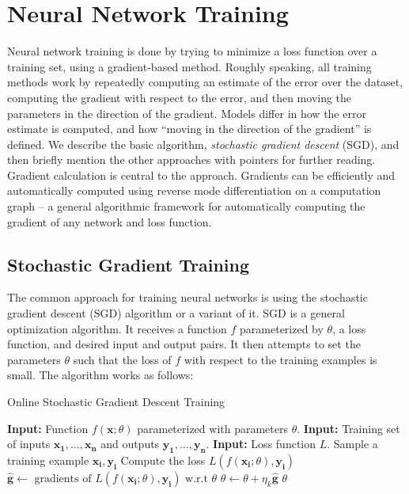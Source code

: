 \documentclass[jair,twoside,11pt,theapa]{article}
\newcommand{\m}[1]{\mathbf{#1}}%
\begin{document}
{\clearpage
\section{Neural Network Training}
\label{sec:training}

Neural network training is done by trying to minimize a loss function over a
training set, using a gradient-based method.  Roughly speaking, all training
methods work by repeatedly computing an estimate of the error over the dataset, computing
the gradient with respect to the error, and then moving the parameters in the direction
of the gradient.  Models differ in how the error estimate is computed, and how
``moving in the direction of the gradient'' is defined.  We describe the
basic algorithm, \emph{stochastic gradient descent} (SGD),
and then briefly mention the other approaches with pointers for further reading.
Gradient calculation is central to the approach. Gradients can be efficiently
and automatically computed using reverse mode differentiation on a computation
graph -- a general
algorithmic framework for automatically computing the gradient of any network
and loss function.

\subsection{Stochastic Gradient Training}

The common approach for training neural networks is using the stochastic gradient
descent (SGD) algorithm \cite{bottou2012stochastic,lecun1998efficient} or a
variant of it.
SGD is a general optimization algorithm. It receives a function $f$
parameterized by $\theta$,
a loss function, and desired input and output pairs. It then attempts
to set the parameters $\theta$ such that the loss of $f$ with respect to the training examples is small.
\noindent The algorithm works as follows:

\begin{algorithm}[h]
    \caption{Online Stochastic Gradient Descent Training}
   \label{alg:online-sgd}
\begin{algorithmic}[1]
    \State \textbf{Input:} Function $f(\m{x}; \theta)$ parameterized with parameters
    $\theta$.
    \State \textbf{Input:} Training set of inputs $\m{x_1},\ldots,\m{x_n}$ and outputs $\m{y_1},\ldots,\m{y_n}$.
    \State \textbf{Input:} Loss function $L$.
        \State Sample a training example $\m{x_i},\m{y_i}$
        \State Compute the loss $L(f(\m{x_i}; \theta), \m{y_i})$ \label{line:loss1}
    \State $\m{\hat{g}} \gets \text{ gradients of }  L(f(\m{x_i}; \theta), \m{y_i}) 
                \text{ w.r.t } \theta $ \label{line:grad1} 
    \State $\theta \gets \theta + \eta_k \m{\hat{g}} $ \label{line:update1}
   \EndWhile
   \State \Return $\theta$
\end{algorithmic}
\end{algorithm}

}
\end{document}
